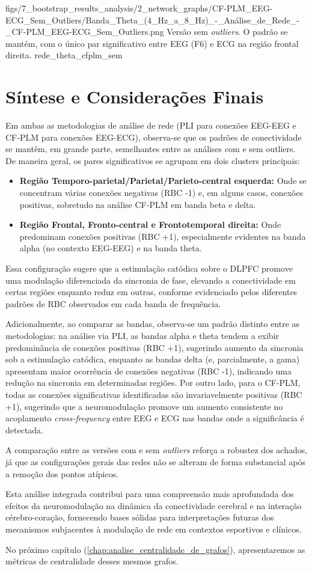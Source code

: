 \smallfigure
{figs/7_bootstrap_results_analysis/2_network_graphs/CF-PLM_EEG-ECG_Sem_Outliers/Banda_Theta_(4_Hz_a_8_Hz)_-_Análise_de_Rede_-_CF-PLM_EEG-ECG_Sem_Outliers.png}
{Versão sem \textit{outliers}. O padrão se mantém, com o único par significativo entre EEG (F6) e ECG na região frontal direita.}
{rede_theta_cfplm_sem}


\section{Síntese e Considerações Finais}
Em ambas as metodologias de análise de rede (PLI para conexões EEG-EEG e CF‐PLM para conexões EEG-ECG), observa-se que os padrões de conectividade se mantêm, em grande parte, semelhantes entre as análises com e sem outliers. De maneira geral, os pares significativos se agrupam em dois clusters principais: 
\begin{itemize}
    \item \textbf{Região Temporo-parietal/Parietal/Parieto-central esquerda:} Onde se concentram várias conexões negativas (RBC -1) e, em alguns casos, conexões positivas, sobretudo na análise CF‐PLM em banda beta e delta.
    \item \textbf{Região Frontal, Fronto-central e Frontotemporal direita:} Onde predominam conexões positivas (RBC +1), especialmente evidentes na banda alpha (no contexto EEG-EEG) e na banda theta.
\end{itemize}

Essa configuração sugere que a estimulação catódica sobre o DLPFC promove uma modulação diferenciada da sincronia de fase, elevando a conectividade em certas regiões enquanto reduz em outras, conforme evidenciado pelos diferentes padrões de RBC observados em cada banda de frequência.

Adicionalmente, ao comparar as bandas, observa-se um padrão distinto entre as metodologias: na análise via PLI, as bandas alpha e theta tendem a exibir predominância de conexões positivas (RBC +1), sugerindo aumento da sincronia sob a estimulação catódica, enquanto as bandas delta (e, parcialmente, a gama) apresentam maior ocorrência de conexões negativas (RBC -1), indicando uma redução na sincronia em determinadas regiões. Por outro lado, para o CF-PLM, todas as conexões significativas identificadas são invariavelmente positivas (RBC +1), sugerindo que a neuromodulação promove um aumento consistente no acoplamento \textit{cross-frequency} entre EEG e ECG nas bandas onde a significância é detectada.

A comparação entre as versões com e sem \textit{outliers} reforça a robustez dos achados, já que as configurações gerais das redes não se alteram de forma substancial após a remoção dos pontos atípicos.

Esta análise integrada contribui para uma compreensão mais aprofundada dos efeitos da neuromodulação na dinâmica da conectividade cerebral e na interação cérebro-coração, fornecendo bases sólidas para interpretações futuras dos mecanismos subjacentes à modulação de rede em contextos esportivos e clínicos.

No próximo capítulo (\ref{chap:analise_centralidade_de_grafos}), apresentaremos as métricas de centralidade desses mesmos grafos.